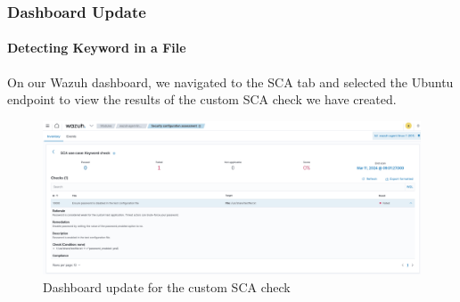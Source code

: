 \subsubsection{Dashboard Update}
\paragraph{Detecting Keyword in a File}
On our Wazuh dashboard, we navigated to the SCA tab and selected the Ubuntu endpoint to view the results of the custom SCA check we have created.
\begin{figure} [H]
    \centering
    \includegraphics[width=\textwidth]{images/sca/sca-5.png}
    \caption{Dashboard update for the custom SCA check}
    \label{fig:sca-5}
\end{figure}


